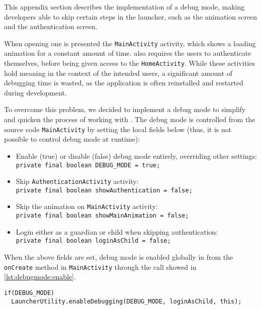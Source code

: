 This appendix section describes the implementation of a debug mode, making developers able to skip certain steps in the launcher, such as the animation screen and the authentication screen.\\


When opening \launcher one is presented the \lstinline{MainActivity} activity, which shows a loading animation for a constant amount of time.
\launcher also requires the users to authenticate themselves, before being given access to the \lstinline{HomeActivity}.
While these activities hold meaning in the context of the intended users, a significant amount of debugging time is wasted, as the application is often reinstalled and restarted during development. 

To overcome this problem, we decided to implement a debug mode to simplify and quicken the process of working with \launcher.
The debug mode is controlled from the source code \lstinline|MainActivity| by setting the local fields below (thus, it is not possible to control debug mode at runtime):

\begin{itemize}
\item Enable (true) or disable (false) debug mode entirely, overriding other settings:\\
\lstinline|private final boolean DEBUG_MODE = true;|
\item Skip \lstinline|AuthenticationActivity| activity:\\
\lstinline|private final boolean showAuthentication = false;|
\item Skip the animation on \lstinline|MainActivity| activity:\\
\lstinline|private final boolean showMainAnimation = false;|
\item Login either as a guardian or child when skipping authentication:\\
\lstinline|private final boolean loginAsChild = false;|
\end{itemize}

When the above fields are set, debug mode is enabled globally in \launcher from the \lstinline|onCreate| method in \lstinline|MainActivity| through the call showed in \cref{lst:debugmode:enable}.

\begin{lstlisting}[caption={Enable debug mode from \lstinline|MainActivity|.},label={lst:debugmode:enable}]  
if(DEBUG_MODE)
  LauncherUtility.enableDebugging(DEBUG_MODE, loginAsChild, this);
\end{lstlisting}

